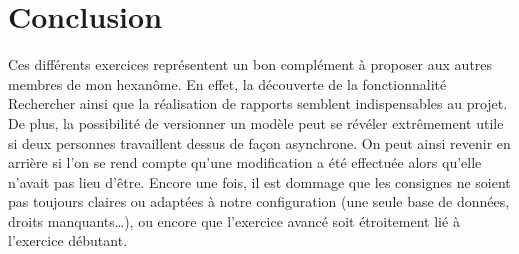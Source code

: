 \section{Conclusion}

Ces différents exercices représentent un bon complément à proposer aux autres membres de mon hexanôme. En effet, la découverte de la fonctionnalité \og{}Rechercher\fg{} ainsi que la réalisation de rapports semblent indispensables au projet. De plus, la possibilité de versionner un modèle peut se révéler extrêmement utile si deux personnes travaillent dessus de façon asynchrone. On peut ainsi revenir en arrière si l’on se rend compte qu'une modification a été effectuée alors qu'elle n'avait pas lieu d'être. Encore une fois, il est dommage que les consignes ne soient pas toujours claires ou adaptées à notre configuration (une seule base de données, droits manquants…), ou encore que l'exercice avancé soit étroitement lié à l'exercice débutant.

